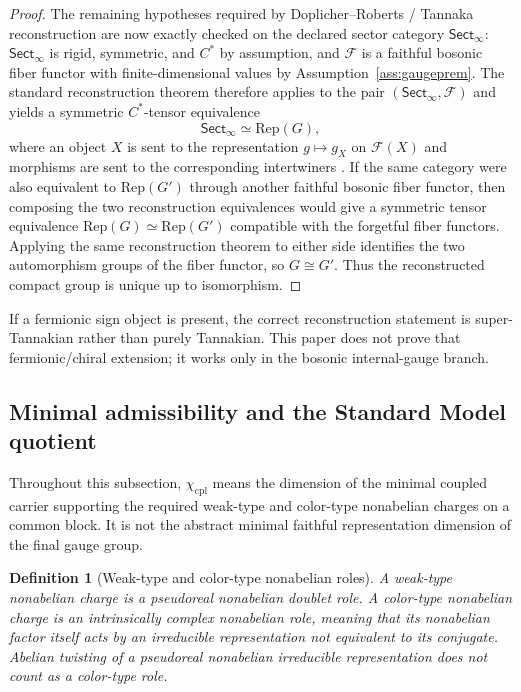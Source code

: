 \documentclass[11pt]{article}
\newtheorem{definition}[theorem]{Definition}
\begin{document}
\begin{proof}
The remaining hypotheses required by Doplicher--Roberts / Tannaka reconstruction are now exactly checked on the declared sector category \(\mathsf{Sect}_\infty\): \(\mathsf{Sect}_\infty\) is rigid, symmetric, and \(C^*\) by assumption, and \(\mathcal F\) is a faithful bosonic fiber functor with finite-dimensional values by Assumption~\ref{ass:gaugeprem}. The standard reconstruction theorem therefore applies to the pair \((\mathsf{Sect}_\infty,\mathcal F)\) and yields a symmetric \(C^*\)-tensor equivalence
\[
\mathsf{Sect}_\infty \simeq \mathrm{Rep}(G),
\]
where an object \(X\) is sent to the representation \(g\mapsto g_X\) on \(\mathcal F(X)\) and morphisms are sent to the corresponding intertwiners \cite{dr89,dr90}. If the same category were also equivalent to \(\mathrm{Rep}(G')\) through another faithful bosonic fiber functor, then composing the two reconstruction equivalences would give a symmetric tensor equivalence \(\mathrm{Rep}(G)\simeq\mathrm{Rep}(G')\) compatible with the forgetful fiber functors. Applying the same reconstruction theorem to either side identifies the two automorphism groups of the fiber functor, so \(G\cong G'\). Thus the reconstructed compact group is unique up to isomorphism.
\end{proof}

If a fermionic sign object is present, the correct reconstruction statement is super-Tannakian rather than purely Tannakian. This paper does not prove that fermionic/chiral extension; it works only in the bosonic internal-gauge branch.

\subsection{Minimal admissibility and the Standard Model quotient}

Throughout this subsection, $\chi_{\mathrm{cpl}}$ means the dimension of the minimal coupled carrier supporting the required weak-type and color-type nonabelian charges on a common block. It is not the abstract minimal faithful representation dimension of the final gauge group.

\begin{definition}[Weak-type and color-type nonabelian roles]
A weak-type nonabelian charge is a pseudoreal nonabelian doublet role. A color-type nonabelian charge is an intrinsically complex nonabelian role, meaning that its nonabelian factor itself acts by an irreducible representation not equivalent to its conjugate. Abelian twisting of a pseudoreal nonabelian irreducible representation does not count as a color-type role.
\end{definition}
\end{document}
